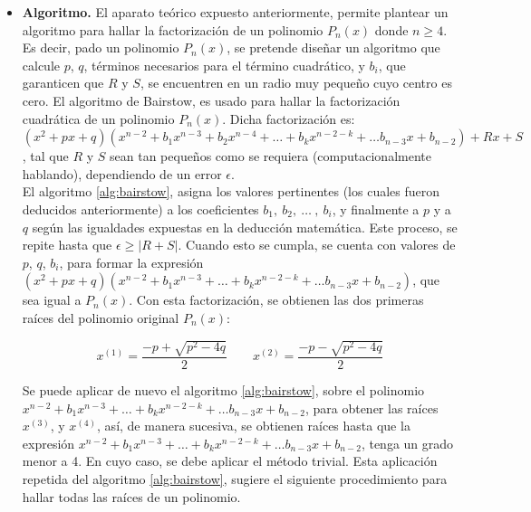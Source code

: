 \documentclass[11pt, spanish]{article}
\begin{document}
\begin{itemize}
\item \textbf{Algoritmo.} El aparato teórico expuesto anteriormente, permite plantear un algoritmo para hallar la factorización de un polinomio $P_n(x)$ donde $n \geq 4$. Es decir, pado un polinomio $P_n(x)$, se pretende diseñar un algoritmo que calcule $p$, $q$, términos necesarios para el término cuadrático, y $b_i$, que garanticen que $R$ y $S$, se encuentren en un radio muy pequeño cuyo centro es cero. El algoritmo de Bairstow, es usado para hallar la factorización cuadrática de un polinomio $P_n(x)$. Dicha factorización es: $(x^2+px+q)(x^{n - 2} + b_{1}x^{n - 3} + b_{2}x^{n-4} + \dots + b_{k}x^{n-2-k} + \dots b_{n-3}x + b_{n-2}) + Rx + S$, tal que $R$ y $S$ sean tan pequeños como se requiera (computacionalmente hablando), dependiendo de un error $\epsilon$.\\

El algoritmo \ref{alg:bairstow}, asigna los valores pertinentes (los cuales fueron deducidos anteriormente) a los coeficientes $b_1,\ b_2,\ \dots\ ,\ b_i$, y finalmente a $p$ y a $q$ según las igualdades expuestas en la deducción matemática. Este proceso, se repite hasta que $\epsilon \geq |R + S|$. Cuando esto se cumpla, se cuenta con valores de $p$, $q$, $b_i$, para formar la expresión $(x^2 + px + q)(x^{n - 2} + b_{1}x^{n - 3}  + \dots + b_{k}x^{n-2-k} + \dots b_{n-3}x + b_{n-2})$, que sea igual a $P_n(x)$. Con esta factorización, se obtienen las dos primeras raíces del polinomio original $P_n(x)$:

$$x^{(1)} = \frac{-p + \sqrt{p^2 - 4q}}{2} \qquad  x^{(2)} = \frac{-p - \sqrt{p^2 - 4q}}{2}$$

Se puede aplicar de nuevo el algoritmo \ref{alg:bairstow}, sobre el polinomio $x^{n - 2} + b_{1}x^{n - 3}  + \dots + b_{k}x^{n-2-k} + \dots b_{n-3}x + b_{n-2}$, para obtener las raíces $x^{(3)}$, y $x^{(4)}$, así, de manera sucesiva, se obtienen raíces hasta que la expresión $x^{n - 2} + b_{1}x^{n - 3}  + \dots + b_{k}x^{n-2-k} + \dots b_{n-3}x + b_{n-2}$, tenga un grado menor a 4. En cuyo caso, se debe aplicar el método trivial. Esta aplicación repetida del algoritmo \ref{alg:bairstow}, sugiere el siguiente procedimiento para hallar todas las raíces de un polinomio.


\end{itemize}
\end{document}
